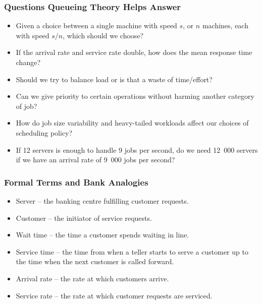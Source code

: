 \begin{frame}
\frametitle{Questions Queueing Theory Helps Answer}

\begin{itemize}
 \item Given a choice between a single machine with speed $s$, or $n$ machines, each with speed $s/n$, which should we choose?
 \item If the arrival rate and service rate double, how does the mean response time change?
 \item Should we try to balance load or is that a waste of time/effort?
 \item Can we give priority to certain operations without harming another category of job?
 \item How do job size variability and heavy-tailed workloads affect our choices of scheduling policy?
 \item If 12 servers is enough to handle 9 jobs per second, do we need 12~000 servers if we have an arrival rate of 9~000 jobs per second?
\end{itemize}

\end{frame}



\begin{frame}
\frametitle{Formal Terms and Bank Analogies}

\begin{itemize}
	\item Server -- the banking centre fulfilling customer requests.
	\item Customer -- the initiator of service requests.
	\item Wait time -- the time a customer spends waiting in line.
	\item Service time -- the time from when a teller starts to serve a customer up to the time when the next customer is called forward.
	\item Arrival rate -- the rate at which customers arrive.
	\item Service rate -- the rate at which customer requests are serviced.

\end{itemize}

\end{frame}



